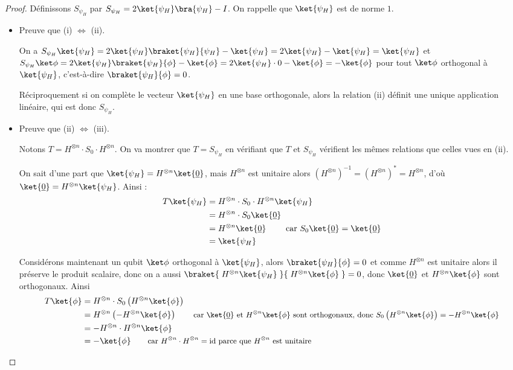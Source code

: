 \documentclass[11pt,class=report,crop=false]{standalone}
\begin{document}
\begin{proof}
Définissons $S_{\psi_H}$ par $S_{\psi_H} = 2 \ket{\psi_H} \bra{\psi_H} - I$.
On rappelle que $\ket{\psi_H}$ est de norme $1$.
\begin{itemize}
  \item Preuve que (i) $\iff$ (ii). 

On a  $S_{\psi_H}\ket{\psi_H} = 2 \ket{\psi_H} \braket{\psi_H}{\psi_H} - \ket{\psi_H} = 2 \ket{\psi_H} - \ket{\psi_H} = \ket{\psi_H} $
et $S_{\psi_H}\ket\phi = 2 \ket{\psi_H} \braket{\psi_H}{\phi} - \ket{\phi}
= 2 \ket{\psi_H}  \cdot 0 - \ket{\phi} = -\ket{\phi}$ pour tout $\ket\phi$  orthogonal à $\ket{\psi_H}$, c'est-à-dire $\braket{\psi_H}{\phi}=0$.

Réciproquement si on complète le vecteur $\ket{\psi_H}$ en une base orthogonale, alors la relation (ii) définit une unique application linéaire, qui est donc $S_{\psi_H}$.

  \item Preuve que (ii) $\iff$ (iii). 

Notons $T = H^{\otimes n} \cdot S_0 \cdot H^{\otimes n}$. On va montrer que $T=S_{\psi_H}$ en vérifiant que $T$ et $S_{\psi_H}$ vérifient les mêmes relations que celles vues en (ii).

 On sait d'une part que  $\ket{\psi_H} = H^{\otimes n} \ket{\underline0}$,
mais $H^{\otimes n}$ est unitaire alors $(H^{\otimes n})^{-1} = (H^{\otimes n})^* = H^{\otimes n}$, d'où $\ket{\underline0}= H^{\otimes n} \ket{\psi_H}$.
Ainsi :
\begin{align*}
T \ket{\psi_H} 
  &= H^{\otimes n} \cdot S_0 \cdot H^{\otimes n} \ket{\psi_H} \\
  &= H^{\otimes n} \cdot S_0 \ket{\underline0} \\
  &= H^{\otimes n} \ket{\underline0} \qquad \text{ car } S_0 \ket{\underline0} = \ket{\underline0}\\
  &= \ket{\psi_H} \\
\end{align*}

Considérons maintenant un qubit $\ket\phi$ orthogonal à $\ket{\psi_H}$,
alors $\braket{\psi_H}{\phi}=0$ et comme $H^{\otimes n}$ est unitaire alors
il préserve le produit scalaire, donc on a aussi 
$\braket{ \; H^{\otimes n}\ket{\psi_H} \; }{ \; H^{\otimes n}\ket{\phi} \; }=0$,
donc $\ket{\underline0}$ et $H^{\otimes n}\ket{\phi}$ sont orthogonaux.
Ainsi 
\begin{align*}
T \ket{\phi} 
  &= H^{\otimes n} \cdot S_0 \left( H^{\otimes n} \ket{\phi} \right) \\
  &= H^{\otimes n}  \left(- H^{\otimes n} \ket{\phi} \right) \qquad \text{\small car $\ket{\underline0}$ et $H^{\otimes n}\ket{\phi}$ sont orthogonaux, donc $S_0 \left( H^{\otimes n}\ket{\phi}\right) = - H^{\otimes n} \ket{\phi}$} \\
  &= - H^{\otimes n} \cdot H^{\otimes n}  \ket{\phi} \\
  &= -\ket{\phi} \qquad \text{\small car $H^{\otimes n} \cdot H^{\otimes n} = \text{id}$ parce que $H^{\otimes n}$ est unitaire} \\
\end{align*}


\end{itemize}
\end{proof}
\end{document}
